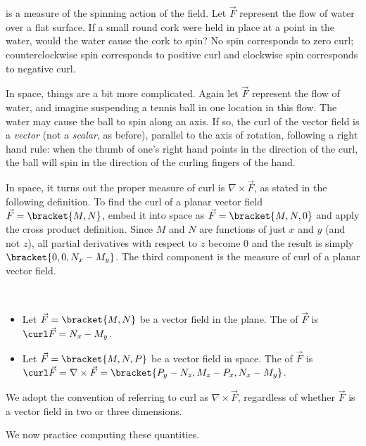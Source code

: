  is a measure of the spinning action of the field. Let $\vec F$ represent the flow of water over a flat surface. If a small round cork were held in place at a point in the water, would the water cause the cork to spin? No spin corresponds to zero curl; counterclockwise spin corresponds to positive curl and clockwise spin corresponds to negative curl. 

In space, things are a bit more complicated. Again let $\vec F$ represent the flow of water, and imagine suspending a tennis ball in one location in this flow. The water may cause the ball to spin along an axis. If so, the curl of the vector field is a \emph{vector} (not a \emph{scalar}, as before), parallel to the axis of rotation, following a right hand rule: when the thumb of one's right hand points in the direction of the curl, the ball will spin in the direction of the curling fingers of the hand.

In space, it turns out the proper measure of curl is $\nabla \times \vec F$, as stated in the following definition. To find the curl of a planar vector field $\vec F =\bracket{M,N}$, embed it into space as $\vec F =\bracket{M, N, 0}$ and apply the cross product definition. Since $M$ and $N$ are functions of just $x$ and $y$ (and not $z$), all partial derivatives with respect to $z$ become 0 and the result is simply $\bracket{0,0,N_x-M_y}$. The third component is the measure of curl of a planar vector field. 

{\mbox{}\\[-2\baselineskip]\begin{itemize}
	\item Let $\vec F =\bracket{M,N}$ be a vector field in the plane. The  of $\vec F$ is $\curl \vec F = N_x - M_y$.
	\item Let $\vec F =\bracket{M,N,P}$ be a vector field in space. The  of $\vec F$ is $\curl \vec F = \nabla \times \vec F =\bracket{P_y-N_z,M_z-P_x,N_x - M_y}$.
\end{itemize}}

We adopt the convention of referring to curl as $\nabla \times \vec F$, regardless of whether $\vec F$ is a vector field in two or three dimensions. 

We now practice computing these quantities.

